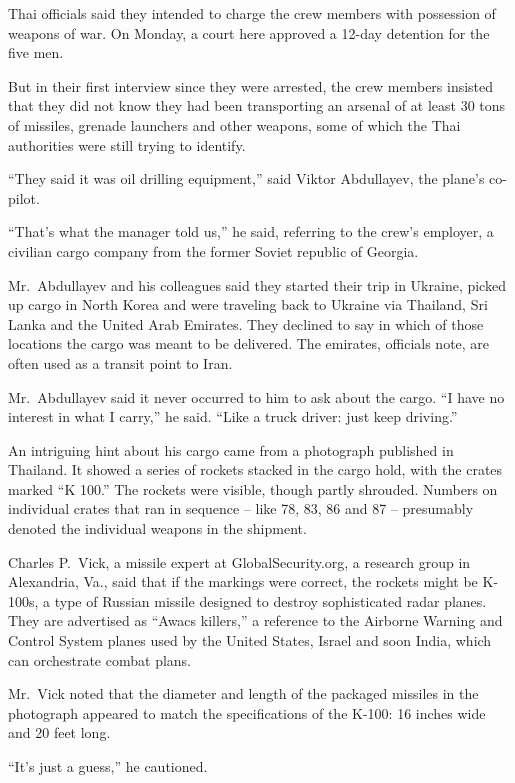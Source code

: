 ﻿\documentclass[12pt]{article}
\begin{document}
Thai officials said they intended to charge the crew members with possession of weapons of war. On
Monday, a court here approved a 12-day detention for the five men.

But in their first interview since they were arrested, the crew members insisted that they did not
know they had been transporting an arsenal of at least 30 tons of missiles, grenade launchers and
other weapons, some of which the Thai authorities were still trying to identify.

``They said it was oil drilling equipment,'' said Viktor Abdullayev, the plane's co-pilot.

``That's what the manager told us,'' he said, referring to the crew's employer, a civilian cargo
company from the former Soviet republic of Georgia.

Mr.~Abdullayev and his colleagues said they started their trip in Ukraine, picked up cargo in North
Korea and were traveling back to Ukraine via Thailand, Sri Lanka and the United Arab Emirates. They
declined to say in which of those locations the cargo was meant to be delivered. The emirates,
officials note, are often used as a transit point to Iran.

Mr.~Abdullayev said it never occurred to him to ask about the cargo. ``I have no interest in what I
carry,'' he said. ``Like a truck driver: just keep driving.''

An intriguing hint about his cargo came from a photograph published in Thailand. It showed a series
of rockets stacked in the cargo hold, with the crates marked ``K 100.'' The rockets were visible,
though partly shrouded. Numbers on individual crates that ran in sequence -- like 78, 83, 86 and 87
-- presumably denoted the individual weapons in the shipment.

Charles P.~Vick, a missile expert at GlobalSecurity.org, a research group in Alexandria, Va., said
that if the markings were correct, the rockets might be K-100s, a type of Russian missile designed
to destroy sophisticated radar planes. They are advertised as ``Awacs killers,'' a reference to the
Airborne Warning and Control System planes used by the United States, Israel and soon India, which
can orchestrate combat plans.

Mr.~Vick noted that the diameter and length of the packaged missiles in the photograph appeared to
match the specifications of the K-100: 16 inches wide and 20 feet long.

``It's just a guess,'' he cautioned.
\end{document}
